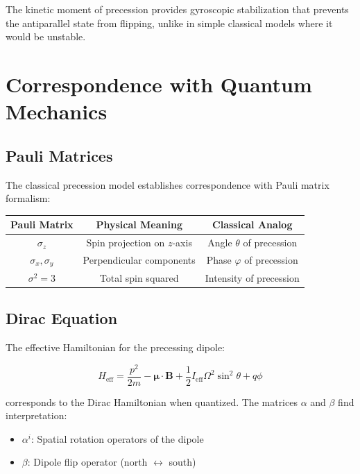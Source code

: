 \documentclass[12pt]{article}
\begin{document}
The kinetic moment of precession provides gyroscopic stabilization that prevents the antiparallel state from flipping, unlike in simple classical models where it would be unstable.

\section{Correspondence with Quantum Mechanics}

\subsection{Pauli Matrices}

The classical precession model establishes correspondence with Pauli matrix formalism:

\begin{center}
\begin{tabular}{|c|c|c|}
\hline
\textbf{Pauli Matrix} & \textbf{Physical Meaning} & \textbf{Classical Analog} \\
\hline
$\sigma_z$ & Spin projection on $z$-axis & Angle $\theta$ of precession \\
$\sigma_x, \sigma_y$ & Perpendicular components & Phase $\varphi$ of precession \\
$\sigma^2 = 3$ & Total spin squared & Intensity of precession \\
\hline
\end{tabular}
\end{center}

\subsection{Dirac Equation}

The effective Hamiltonian for the precessing dipole:

\begin{equation}
H_{\text{eff}} = \frac{p^2}{2m} - \boldsymbol{\mu} \cdot \boldsymbol{B} + \frac{1}{2} I_{\text{eff}} \Omega^2 \sin^2\theta + q\phi
\end{equation}

corresponds to the Dirac Hamiltonian when quantized. The matrices $\alpha$ and $\beta$ find interpretation:

\begin{itemize}
\item $\alpha^i$: Spatial rotation operators of the dipole
\item $\beta$: Dipole flip operator (north $\leftrightarrow$ south)
\end{itemize}
\end{document}
